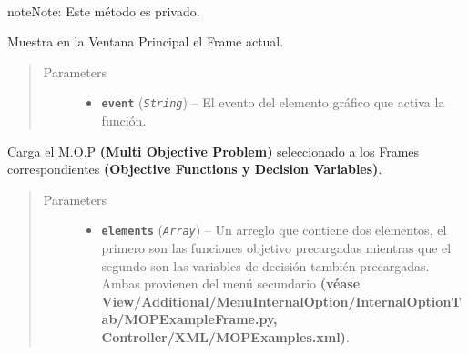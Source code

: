 \documentclass[class=report, crop=false]{standalone}
\begin{document}
\begin{fulllineitems}
\begin{fulllineitems}
\end{fulllineitems}

\begin{fulllineitems}

~

\begin{notice}{note}{Note:}
Este método es privado.
\end{notice}

Muestra en la Ventana Principal el Frame actual.

\begin{quote}\begin{description}
\item[{Parameters}] \leavevmode\begin{itemize}
\item \textbf{\texttt{event}} (\emph{\texttt{String}}) -- El evento del elemento gráfico que 
activa la función.
\end{itemize}
\end{description}\end{quote}

\end{fulllineitems}

\begin{fulllineitems}

Carga el M.O.P \textbf{(Multi Objective Problem)} seleccionado
a los Frames correspondientes \textbf{(Objective Functions y Decision Variables)}.

\begin{quote}\begin{description}
\item[{Parameters}] \leavevmode\begin{itemize}
\item \textbf{\texttt{elements}} (\emph{\texttt{Array}}) -- Un arreglo que contiene dos elementos, el primero son las funciones objetivo precargadas mientras que el segundo son las variables de decisión también precargadas. Ambas provienen del menú secundario \textbf{(véase View/Additional/}\break\textbf{MenuInternalOption/InternalOptionTab/}\break\textbf{MOPExampleFrame.py, Controller/XML/}\break\textbf{MOPExamples.xml)}.
\end{itemize}
\end{description}\end{quote}


\end{fulllineitems}
\end{fulllineitems}
\end{document}
